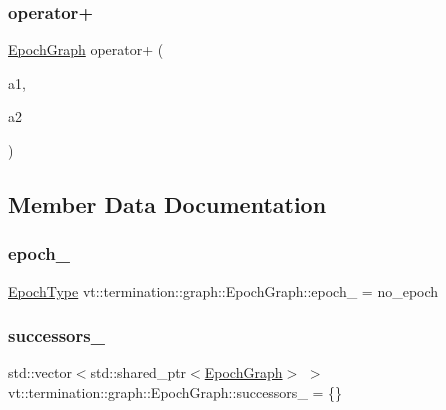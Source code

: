 \subsubsection{\texorpdfstring{operator+}{operator+}}
{\footnotesize\ttfamily \hyperlink{structvt_1_1termination_1_1graph_1_1_epoch_graph}{Epoch\+Graph} operator+ (\begin{DoxyParamCaption}\item[{\hyperlink{structvt_1_1termination_1_1graph_1_1_epoch_graph}{Epoch\+Graph}}]{a1,  }\item[{\hyperlink{structvt_1_1termination_1_1graph_1_1_epoch_graph}{Epoch\+Graph} const \&}]{a2 }\end{DoxyParamCaption})\hspace{0.3cm}{\ttfamily [friend]}}



\subsection{Member Data Documentation}
\mbox{\label{structvt_1_1termination_1_1graph_1_1_epoch_graph_a833365232980fd3e2ab084550c6efa20}} 
\subsubsection{\texorpdfstring{epoch\+\_\+}{epoch\_}}
{\footnotesize\ttfamily \hyperlink{namespacevt_a985a5adf291c34a3ca263b3378388236}{Epoch\+Type} vt\+::termination\+::graph\+::\+Epoch\+Graph\+::epoch\+\_\+ = no\+\_\+epoch\hspace{0.3cm}{\ttfamily [private]}}

\mbox{\label{structvt_1_1termination_1_1graph_1_1_epoch_graph_ac30660eb1ec7ffc171da6d99b34513ee}} 
\subsubsection{\texorpdfstring{successors\+\_\+}{successors\_}}
{\footnotesize\ttfamily std\+::vector$<$std\+::shared\+\_\+ptr$<$\hyperlink{structvt_1_1termination_1_1graph_1_1_epoch_graph}{Epoch\+Graph}$>$ $>$ vt\+::termination\+::graph\+::\+Epoch\+Graph\+::successors\+\_\+ = \{\}\hspace{0.3cm}{\ttfamily [private]}}

